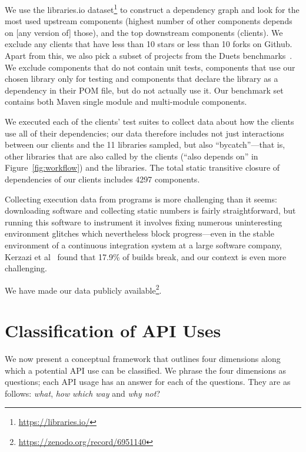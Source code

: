 We use the libraries.io dataset\footnote{\url{https://libraries.io/}} to construct a dependency graph and look for the most used upstream components (highest number of other components depends on [any version of] those), 
and the top downstream components (clients). We exclude any clients that have less than 10 stars or less than 10 forks on Github.  Apart from this, we also pick a subset of projects from the
Duets benchmarks~\cite{durieux21}. We exclude components that do not contain unit tests, components that use our chosen library only for testing
and components that declare the library as a dependency in their POM file, but do not actually use it. Our benchmark set contains both Maven single module and multi-module components.

We executed each of the clients' test suites to collect data about how the clients use all of their dependencies; our data therefore includes not just interactions between our clients and the 11 libraries sampled, but also ``bycatch''---that is, other libraries that are also called by the clients (``also depends on'' in Figure~\ref{fig:workflow}) and the libraries. The total static transitive closure of dependencies of our clients includes 4297 components.

Collecting execution data from programs is more challenging than it seems: downloading software and collecting static numbers is fairly straightforward, but running this software to instrument it involves fixing numerous uninteresting environment glitches which nevertheless block progress---even in the stable environment of a continuous integration system at a large software company, Kerzazi et al~\cite{kerzazi14:_why_do_autom_build_break} found that 17.9\% of builds break, and our context is even more challenging.

We have made our data publicly available\footnote{\url{https://zenodo.org/record/6951140}}.


\section{Classification of API Uses}
\label{sec:classification}

We now present a conceptual framework that outlines four dimensions along which a potential API use can be classified. We phrase the four dimensions as questions; each API usage has an answer for each of the questions. They are as follows: \emph{what}, \emph{how} \emph{which way} and \emph{why not}?

